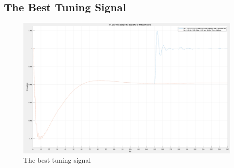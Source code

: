 \subsection{The Best Tuning Signal} %

\begin{figure}[htbp]
\centering
\includegraphics[width = .819\textwidth]{figure/4_4_2_best.png}
\caption{The best tuning signal}
\label{4_4_2_best}
\end{figure}